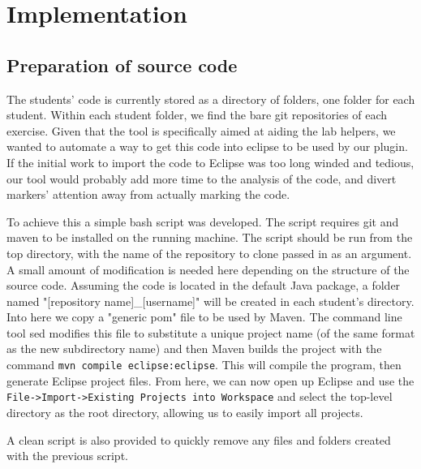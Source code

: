 
\chapter{Implementation} %

\label{Implementation} %


\section{Preparation of source code}

The students' code is currently stored as a directory of folders, one folder for
each student. Within each student folder, we find the bare git repositories of 
each exercise. Given that the tool is specifically aimed at aiding the lab helpers,
we wanted to automate a way to get this code into eclipse to be used by our plugin.
If the initial work to import the code to Eclipse was too long winded and tedious,
our tool would probably add more time to the analysis of the code, and divert markers'
attention away from actually marking the code.

To achieve this a simple bash script was developed. The script requires git and
maven to be installed on the running machine. The script should be run from the
top directory, with the name of the repository to clone passed in as an argument.
A small amount of modification is needed here depending on the structure of the
source code. Assuming the code is located in the default Java package, a folder
named "[repository name]\_[username]" will be created in each student's directory.
Into here we copy a "generic pom" file to be used by Maven. The command line tool
sed modifies this file to substitute a unique project name (of the same format as
the new subdirectory name) and then Maven builds the project with the command 
\texttt{mvn compile eclipse:eclipse}. This will compile the program, then generate
Eclipse project files. From here, we can now open up Eclipse and use the 
\texttt{File->Import->Existing Projects into Workspace} and select the top-level
directory as the root directory, allowing us to easily import all projects.

A clean script is also provided to quickly remove any files and folders created with
the previous script.

